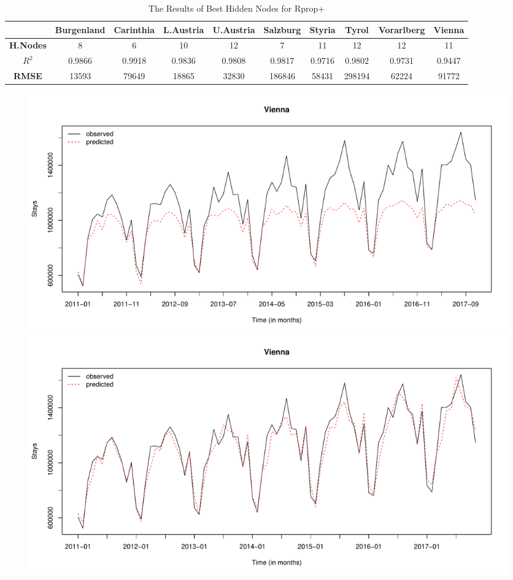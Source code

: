 \documentclass[a4paper,reqno,]{article}
\begin{document}
\begin{enumerate}
\begin{table}[H]
  \centering
	\small
    \begin{tabular}{cccccccccc}
    \toprule
          & Burgenland & Carinthia & L.Austria & U.Austria & Salzburg & Styria & Tyrol & Vorarlberg & Vienna \\
    \midrule
    \textbf{H.Nodes} & 8     & 6     & 10    & 12    & 7     & 11    & 12    & 12    & 11 \\
    \textbf{$R^{2}$}    & \cellcolor[rgb]{ .984,  .922,  .933}0.9866 & \cellcolor[rgb]{ .988,  .988,  1}0.9918 & \cellcolor[rgb]{ .984,  .886,  .898}0.9836 & \cellcolor[rgb]{ .984,  .851,  .863}0.9808 & \cellcolor[rgb]{ .984,  .863,  .875}0.9817 & \cellcolor[rgb]{ .98,  .741,  .749}0.9716 & \cellcolor[rgb]{ .984,  .843,  .855}0.9802 & \cellcolor[rgb]{ .98,  .757,  .769}0.9731 & \cellcolor[rgb]{ .973,  .412,  .42}0.9447 \\
    \textbf{RMSE}  & \cellcolor[rgb]{ .988,  .988,  1}13593 & \cellcolor[rgb]{ .988,  .855,  .867}79649 & \cellcolor[rgb]{ .988,  .98,  .992}18865 & \cellcolor[rgb]{ .988,  .953,  .961}32830 & \cellcolor[rgb]{ .98,  .639,  .647}186846 & \cellcolor[rgb]{ .988,  .898,  .91}58431 & \cellcolor[rgb]{ .973,  .412,  .42}298194 & \cellcolor[rgb]{ .988,  .89,  .902}62224 & \cellcolor[rgb]{ .984,  .831,  .843}91772 \\    
    \bottomrule
    \end{tabular}
\caption{The Results of Best Hidden Nodes for Rprop+}
\label{tab:rprop_dhn}
\end{table}
\begin{figure}[H]
\begin{minipage}[b]{0.49\textwidth}
\centering    \includegraphics[width=\textwidth]{images/ANN/nnet_Vienna_.pdf}
\end{minipage}
\begin{minipage}[b]{0.49\textwidth}
\centering    \includegraphics[width=\textwidth]{images/ANN/neural_Vienna_.pdf}  

\end{minipage}
\end{figure}
\end{enumerate}
\end{document}
